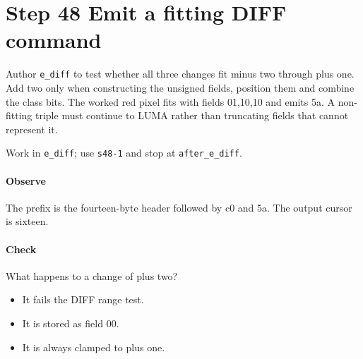 \section{Step 48 Emit a fitting DIFF command}\label{qoi-s48}
Author \texttt{e\_diff} to test whether all three changes fit minus two through plus one. Add two only when constructing the unsigned fields, position them and combine the class bits. The worked red pixel fits with fields 01,10,10 and emits 5a. A non-fitting triple must continue to LUMA rather than truncating fields that cannot represent it.

Work in \texttt{e\_diff}; use \texttt{s48-1} and stop at \texttt{after\_e\_diff}.

\paragraph{Observe} The prefix is the fourteen-byte header followed by c0 and 5a. The output cursor is sixteen.

\paragraph{Check} What happens to a change of plus two?
\begin{itemize}
\item[A.] It fails the DIFF range test.
\item[B.] It is stored as field 00.
\item[C.] It is always clamped to plus one.
\end{itemize}
